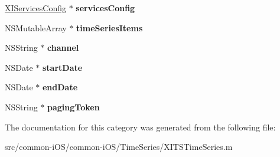 \begin{DoxyCompactItemize}
\item 
\hypertarget{category_x_i_t_s_time_series_07_08_ab005e71d66dec36aa6c2d3a96cbe2421}{}\label{category_x_i_t_s_time_series_07_08_ab005e71d66dec36aa6c2d3a96cbe2421} 
\hyperlink{interface_x_i_services_config}{X\+I\+Services\+Config} $\ast$ {\bfseries services\+Config}
\item 
\hypertarget{category_x_i_t_s_time_series_07_08_ac1c1725a04f1ac8824190bc91a31ce7b}{}\label{category_x_i_t_s_time_series_07_08_ac1c1725a04f1ac8824190bc91a31ce7b} 
N\+S\+Mutable\+Array $\ast$ {\bfseries time\+Series\+Items}
\item 
\hypertarget{category_x_i_t_s_time_series_07_08_a5f9ec8d2c6527c457dbb4e212d6d0b56}{}\label{category_x_i_t_s_time_series_07_08_a5f9ec8d2c6527c457dbb4e212d6d0b56} 
N\+S\+String $\ast$ {\bfseries channel}
\item 
\hypertarget{category_x_i_t_s_time_series_07_08_a1c0e45d72efdd54925a1f84b42e1fc6a}{}\label{category_x_i_t_s_time_series_07_08_a1c0e45d72efdd54925a1f84b42e1fc6a} 
N\+S\+Date $\ast$ {\bfseries start\+Date}
\item 
\hypertarget{category_x_i_t_s_time_series_07_08_a139ab2e8d19d3fead1c6b6dcd4cd1a83}{}\label{category_x_i_t_s_time_series_07_08_a139ab2e8d19d3fead1c6b6dcd4cd1a83} 
N\+S\+Date $\ast$ {\bfseries end\+Date}
\item 
\hypertarget{category_x_i_t_s_time_series_07_08_ad662b51dcd304ccb64a210f6575146c0}{}\label{category_x_i_t_s_time_series_07_08_ad662b51dcd304ccb64a210f6575146c0} 
N\+S\+String $\ast$ {\bfseries paging\+Token}
\end{DoxyCompactItemize}


The documentation for this category was generated from the following file\+:\begin{DoxyCompactItemize}
\item 
src/common-\/i\+O\+S/common-\/i\+O\+S/\+Time\+Series/X\+I\+T\+S\+Time\+Series.\+m\end{DoxyCompactItemize}

